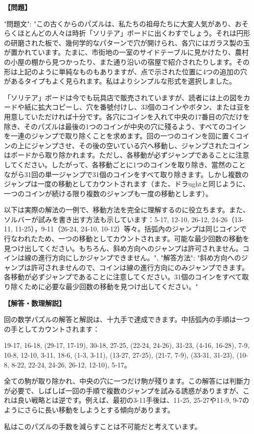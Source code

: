 \documentclass[10pt,a4paper,oneside,openany]{ltjsbook}
\begin{document}
\begin{tcolorbox}[colback=softblue,colframe=primaryblue,title=\textbf{第 227 問：CENTRAL SOLITAIRE.},arc=2mm,boxrule=1pt,breakable]
\textbf{【問題】}\par\vspace{0.3em}
{
  "問題文": "この古くからのパズルは、私たちの祖母たちに大変人気があり、おそらくほとんどの人々は時折「ソリテア」ボードに出くわすでしょう。それは円形の研磨された板で、幾何学的なパターンで穴が開けられ、各穴にはガラス製の玉が置かれています。たまに、市街地の一室のサイドテーブルに見かけたり、農村の小屋の棚から見つかったり、また通り沿いの宿屋で紹介されたりします。その形は上記のように単純なものもありますが、点で示された位置に4つの追加の穴があるタイプもよく見られます。私はよりシンプルな形式を選択しました。

「ソリテア」ボードは今でも玩具店で販売されていますが、読者には上の図をカードや紙に拡大コピーし、穴を番號付けし、33個のコインやボタン、または豆を用意していただければ十分です。各穴にコインを入れて中央の17番目の穴だけを除き、そのパズルは最後の1つのコインが中央の穴に殘るよう、すべてのコインを一連のジャンプで取り除くことを求めます。回の一つのコインを回に置くコインの上にジャンプさせ、その後の空いている穴へ移動し、ジャンプされたコインはボードから取り除かれます。ただし、各移動が必ずジャンプであることに注意してください。したがって、各移動ごとに1つのコインを取り除き、當然のことながら31回の単一ジャンプで31個のコインをすべて取り除きます。しかし複数のジャンプは一度の移動としてカウントされます（また、ドラughtと同じように、一つのコインが続ける限り複数のジャンプも一度の移動とします）。

以下は実際の解法の一例で、移動方法を完全に理解するのに役立ちます。また、ソルバーが試みを書き出す方法も示しています：5-17, 12-10, 26-12, 24-26（13-11, 11-25），9-11（26-24, 24-10, 10-12）等々。括弧內のジャンプは同じコインで行なわれたため、一つの移動としてカウントされます。可能な最少回数の移動を見つけ出してください。もちろん、斜め方向へのジャンプは許可されません。コインは線の進行方向にしかジャンプできません。",
  "解答方法": "斜め方向へのジャンプは許可されませんので、コインは線の進行方向にのみジャンプできます。各移動が必ずジャンプであることに注意してください。31個のコインをすべて取り除くために必要な最少回数の移動を見つけ出してください。"
}
\tcblower
\textbf{【解答・数理解説】}\par\vspace{0.3em}
回の数学パズルの解答と解説は、十九手で達成できます。中括弧內の手順は一つの手としてカウントされます：

19-17, 16-18, (29-17, 17-19), 30-18, 27-25, (22-24, 24-26), 31-23, (4-16, 16-28), 7-9, 10-8, 12-10, 3-11, 18-6, (1-3, 3-11), (13-27, 27-25), (21-7, 7-9), (33-31, 31-23), (10-8, 8-22, 22-24, 24-26, 26-12, 12-10), 5-17。

全ての駒が取り除かれ、中央の穴に一つだけ駒が殘ります。この解答には判斷力が必要で、しばしば一回の手順で複数のジャンプを試みる誘惑がありますが、これは良い戦略とは逆です。例えば、最初の3-11手後は、11-25, 25-27や11-9, 9-7のようにさらに長い移動をしようとする傾向があります。

私はこのパズルの手数を減らすことは不可能だと考えています。
\end{tcolorbox}
\end{document}
